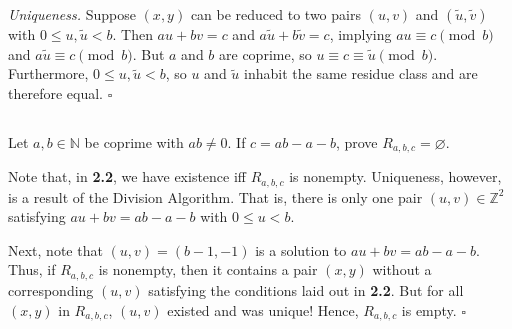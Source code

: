\documentclass{article}
\newcommand{\N}{\mathbb{N}}
\newcommand{\Z}{\mathbb{Z}}
\begin{document}
  \textit{Uniqueness.}
  Suppose $(x,y)$ can be reduced to two pairs $(u,v)$ and $(\tilde{u},
  \tilde{v})$ with $0\leq u,\tilde{u}<b$. Then $au+bv=c$ and $a\tilde{u}+b
  \tilde{v}=c$, implying $au\equiv c\pmod{b}$ and $a\tilde{u}\equiv c\pmod{b}$.
  But $a$ and $b$ are coprime, so $u\equiv c\equiv\tilde{u}\pmod{b}$.
  Furthermore, $0\leq u,\tilde{u}<b$, so $u$ and $\tilde{u}$ inhabit the same
  residue class and are therefore equal.
  \hfill $\square$

\subsection{} %
  Let $a,b\in\N$ be coprime with $ab\ne0$. If $c=ab-a-b$, prove $R_{a,b,c}=
  \varnothing$.

  Note that, in \textbf{2.2}, we have existence iff $R_{a,b,c}$ is nonempty.
  Uniqueness, however, is a result of the Division Algorithm. That is, there is
  only one pair $(u,v)\in\Z^2$ satisfying $au+bv=ab-a-b$ with $0\leq u<b$.

  Next, note that $(u,v)=(b-1,-1)$ is a solution to $au+bv=ab-a-b$. Thus, if
  $R_{a,b,c}$ is nonempty, then it contains a pair $(x,y)$ without a
  corresponding $(u,v)$ satisfying the conditions laid out in \textbf{2.2}. But
  for all $(x,y)$ in $R_{a,b,c}$, $(u,v)$ existed and was unique! Hence,
  $R_{a,b,c}$ is empty.
  \hfill $\square$
\end{document}
